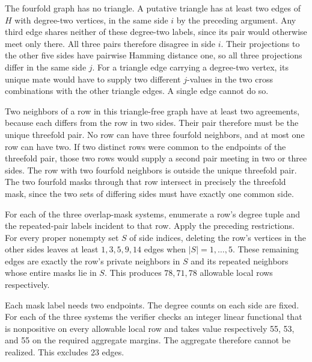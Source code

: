 The fourfold graph has no triangle. A putative triangle has at
least two edges of $H$ with degree-two vertices, in the same side
$i$ by the preceding argument. Any third edge shares neither of
these degree-two labels, since its pair would otherwise meet only
there. All three pairs therefore disagree in side $i$. Their
projections to the other five sides have pairwise Hamming distance
one, so all three projections differ in the same side $j$.
For a triangle edge carrying a degree-two vertex, its unique mate
would have to supply two different $j$-values in the two cross
combinations with the other triangle edges. A single edge cannot do so.

Two neighbors of a row in this triangle-free graph have at least
two agreements, because each differs from the row in two sides.
Their pair therefore must be the unique threefold pair. No row
can have three fourfold neighbors, and at most one row can have
two. If two distinct rows were common to the endpoints of the
threefold pair, those two rows would supply a second pair meeting
in two or three sides. The row with two fourfold neighbors is
outside the unique threefold pair. The two fourfold masks through
that row intersect in precisely the threefold mask, since the two
sets of differing sides must have exactly one common side.

For each of the three overlap-mask systems, enumerate a row's
degree tuple and the repeated-pair labels incident to that row.
Apply the preceding restrictions. For every proper nonempty set
$S$ of side indices, deleting the row's vertices in the other
sides leaves at least $1,3,5,9,14$ edges when $|S|=1,\ldots,5$.
These remaining edges are exactly the row's private neighbors in
$S$ and its repeated neighbors whose entire masks lie in $S$.
This produces $78,71,78$ allowable local rows respectively.

Each mask label needs two endpoints. The degree counts on each
side are fixed. For each of the three systems the verifier checks
an integer linear functional that is nonpositive on every
allowable local row and takes value respectively 55, 53, and 55
on the required aggregate margins. The aggregate therefore cannot
be realized. This excludes 23 edges.

